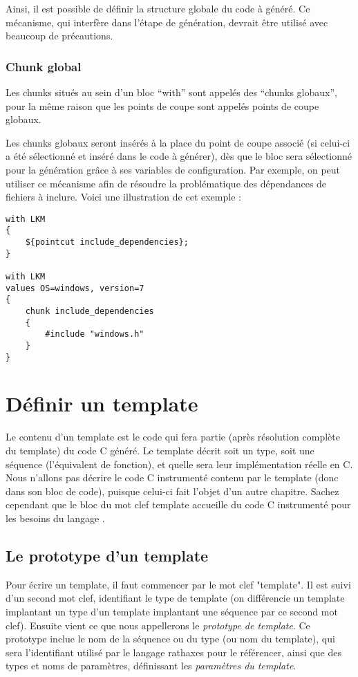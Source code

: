 \documentclass[french]{rtxreport}
\begin{document}
Ainsi, il est possible de définir la structure globale du code à généré. Ce
mécanisme, qui interfère dans l'étape de génération, devrait être utilisé avec
beaucoup de précautions.


\subsection{Chunk global}

Les chunks situés au sein d'un bloc ``with'' sont appelés des ``chunks
globaux'', pour la même raison que les points de coupe sont appelés points de
coupe globaux.

Les chunks globaux seront insérés à la place du point de coupe associé (si
celui-ci a été sélectionné et inséré dans le code à générer), dès que le bloc
sera sélectionné pour la génération grâce à ses variables de configuration. Par
exemple, on peut utiliser ce mécanisme afin de résoudre la problématique des
dépendances de fichiers à inclure. Voici une illustration de cet exemple :

\begin{lstlisting}
with LKM
{
    ${pointcut include_dependencies};
}

with LKM
values OS=windows, version=7
{
    chunk include_dependencies
    {
        #include "windows.h"
    }
}
\end{lstlisting}



\chapter{Définir un template}

Le contenu d'un template est le code qui fera partie (après résolution complète
du template) du code C généré. Le template décrit soit un type, soit une
séquence (l'équivalent \rtx de fonction), et quelle sera leur implémentation
réelle en C. Nous n'allons pas décrire le code C instrumenté contenu par le
template (donc dans son bloc de code), puisque celui-ci fait l'objet d'un autre
chapitre. Sachez cependant que le bloc du mot clef template accueille du code
C instrumenté pour les besoins du langage \rtx.


\section{Le prototype d'un template}

Pour écrire un template, il faut commencer par le mot clef "template". Il est
suivi d'un second mot clef, identifiant le type de template (on différencie un
template implantant un type d'un template implantant une séquence par ce second
mot clef). Ensuite vient ce que nous appellerons le \emph{prototype de
template}. Ce prototype inclue le nom de la séquence ou du type (ou nom du
template), qui sera l'identifiant utilisé par le langage rathaxes pour le
référencer, ainsi que des types et noms de paramètres, définissant les
\emph{paramètres du template}.
\end{document}
